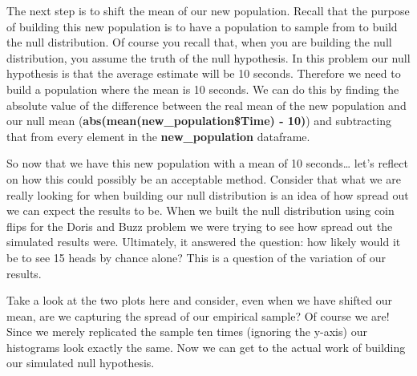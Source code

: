 \documentclass[
]{article}
\begin{document}
The next step is to shift the mean of our new population. Recall that
the purpose of building this new population is to have a population to
sample from to build the null distribution. Of course you recall that,
when you are building the null distribution, you assume the truth of the
null hypothesis. In this problem our null hypothesis is that the average
estimate will be 10 seconds. Therefore we need to build a population
where the mean is 10 seconds. We can do this by finding the absolute
value of the difference between the real mean of the new population and
our null mean (\textbf{abs(mean(new\_population\$Time) - 10)}) and
subtracting that from every element in the \textbf{new\_population}
dataframe.

So now that we have this new population with a mean of 10
seconds\ldots{} let's reflect on how this could possibly be an
acceptable method. Consider that what we are really looking for when
building our null distribution is an idea of how spread out we can
expect the results to be. When we built the null distribution using coin
flips for the Doris and Buzz problem we were trying to see how spread
out the simulated results were. Ultimately, it answered the question:
how likely would it be to see 15 heads by chance alone? This is a
question of the variation of our results.

Take a look at the two plots here and consider, even when we have
shifted our mean, are we capturing the spread of our empirical sample?
Of course we are! Since we merely replicated the sample ten times
(ignoring the y-axis) our histograms look exactly the same. Now we can
get to the actual work of building our simulated null hypothesis.
\end{document}
